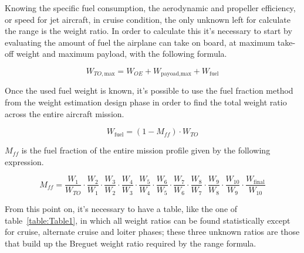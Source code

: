 \bigskip
\noindent
Knowing the specific fuel consumption, the aerodynamic and propeller efficiency, or speed for jet aircraft, in cruise condition, the only unknown left for calculate the range is the weight ratio. In order to calculate this it’s necessary to start by evaluating the amount of fuel the airplane can take on board, at maximum take-off weight and maximum payload, with the following formula.

\begin{equation}
W_{TO,\text{max}}=W_{OE}+W_{\text{payoad,max}}+W_{\text{fuel}}
\label{eqn:Equation1.3}
\end{equation}

\bigskip
\noindent
Once the used fuel weight is known, it’s possible to use the fuel fraction method from the weight estimation design phase in order to find the total weight ratio across the entire aircraft mission. 

\begin{equation}
W_{\text{fuel}}=\left(1-M_{ff}\right)\cdot W_{TO}
\label{eqn:Equation1.4}
\end{equation}

\bigskip
\noindent
$M_{ff}$ is the fuel fraction of the entire mission profile given by the following expression.

\bigskip
\begin{equation}
M_{ff}=\frac{W_1}{W_{TO}}\cdot 
	   \frac{W_2}{W_{1}}\cdot
	   \frac{W_3}{W_{2}}\cdot 
	   \frac{W_4}{W_{3}}\cdot 
	   \frac{W_5}{W_{4}}\cdot 
	   \frac{W_6}{W_{5}}\cdot 
	   \frac{W_7}{W_{6}}\cdot 
	   \frac{W_8}{W_{7}}\cdot 
	   \frac{W_9}{W_{8}}\cdot 
	   \frac{W_{10}}{W_{9}}\cdot 
	   \frac{W_{\text{final}}}{W_{10}} 
	   \label{eqn:Equation1.5} 
\end{equation}

\bigskip
\noindent
From this point on, it’s necessary to have a table, like the one of table~\ref{table:Table1}, in which all weight ratios can be found statistically except for cruise, alternate cruise and loiter phases; these three unknown ratios are those that build up the Breguet weight ratio required by the range formula.   

